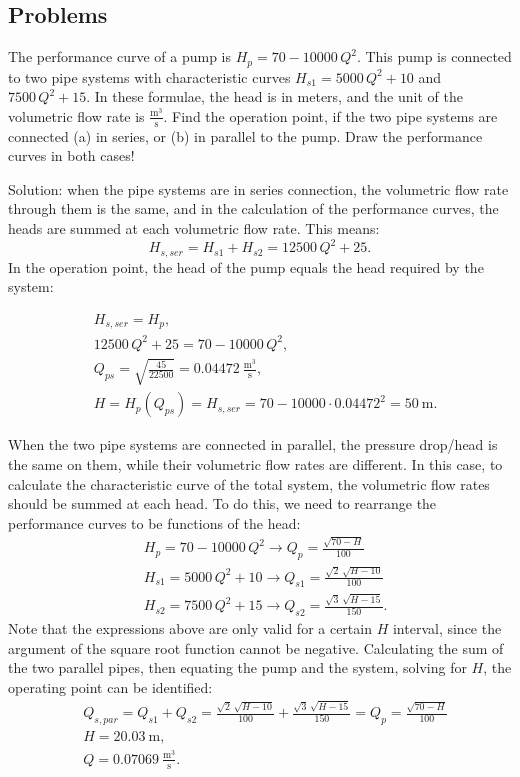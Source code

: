 \subsection{Problems}



The performance curve of a pump is $H_p = 70-10000\,Q^2$. This pump is connected to two pipe systems with characteristic curves $H_{s1} = 5000\,Q^2+10$ and $7500\,Q^2+15$. In these formulae, the head is in meters, and the unit of the volumetric flow rate is $\frac{\mathrm{m^3}}{\mathrm{s}}$. Find the operation point, if the two pipe systems are connected (a) in series, or (b) in parallel to the pump. Draw the performance curves in both cases!

Solution: when the pipe systems are in series connection, the volumetric flow rate through them is the same, and in the calculation of the performance curves, the heads are summed at each volumetric flow rate. This means:
\begin{equation*}
H_{s,ser} = H_{s1} + H_{s2} = 12500\,Q^2+25.
\end{equation*}
In the operation point, the head of the pump equals the head required by the system:

\begin{align*}
& H_{s,ser} = H_p, \\
& 12500\,Q^2+25=70-10000\,Q^2,\\
& Q_{ps} = \sqrt{\frac{45}{22500}} = 0.04472~\frac{\mathrm{m^3}}{\mathrm{s}}, \\
& H = H_p(Q_{ps}) = H_{s,ser} = 70 - 10000\cdot 0.04472^2 = 50~\mathrm{m}.
\end{align*}

When the two pipe systems are connected in parallel, the pressure drop/head is the same on them, while their volumetric flow rates are different. In this case, to calculate the characteristic curve of the total system, the volumetric flow rates should be summed at each head. To do this,  we need to rearrange the performance curves to be functions of the head:
\begin{align*}
& H_p = 70-10000\,Q^2 \rightarrow Q_p = \frac{\sqrt{70-H}}{100} \\
& H_{s1} = 5000\,Q^2+10 \rightarrow Q_{s1} = \frac{\sqrt{2}\,\sqrt{H-10}}{100} \\
& H_{s2} = 7500\,Q^2+15 \rightarrow Q_{s2} = \frac{\sqrt{3}\,\sqrt{H-15}}{150} .
\end{align*}
Note that the expressions above are only valid for a certain $H$ interval, since the argument of the square root function cannot be negative. Calculating the sum of the two parallel pipes, then equating the pump and the system, solving for $H$, the operating point can be identified:
\begin{align*}
& Q_{s,par} = Q_{s1} + Q_{s2} = \frac{\sqrt{2}\,\sqrt{H-10}}{100}+\frac{\sqrt{3}\,\sqrt{H-15}}{150}  = Q_p = \frac{\sqrt{70-H}}{100}\\
& H =  20.03~\mathrm{m}, \\
& Q = 0.07069~\frac{\mathrm{m^3}}{\mathrm{s}}.
\end{align*}

